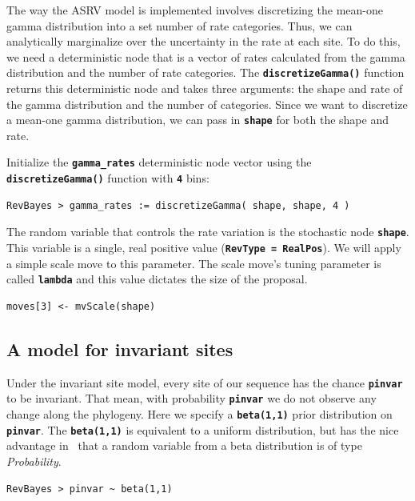 \documentclass[11pt]{article}
\newcommand{\cl}[1]{{\texttt{\textbf{#1}}}}
\begin{document}
The way the ASRV model is implemented involves discretizing the mean-one gamma distribution into a set number of rate categories. 
Thus, we can analytically marginalize over the uncertainty in the rate at each site. 
To do this, we need a deterministic node that is a vector of rates calculated from the gamma distribution and the number of rate categories. 
The \cl{discretizeGamma()} function returns this deterministic node and takes three arguments: the shape and rate of the gamma distribution and the number of categories. Since we want to discretize a mean-one gamma distribution, we can pass in \cl{shape} for both the shape and rate.

Initialize the \cl{gamma\_rates} deterministic node vector using the  \cl{discretizeGamma()} function with \cl{4} bins:
{\tt \begin{snugshade*}
\begin{lstlisting}
RevBayes > gamma_rates := discretizeGamma( shape, shape, 4 )
\end{lstlisting}
\end{snugshade*}}



The random variable that controls the rate variation is the stochastic node \cl{shape}. This variable is a single, real positive value (\cl{RevType = RealPos}). 
We will apply a simple scale move to this parameter.
The scale move's tuning parameter is called \cl{lambda} and this value dictates the size of the proposal.
{\tt \begin{snugshade*}
\begin{lstlisting}
moves[3] <- mvScale(shape)\end{lstlisting}
\end{snugshade*}}


\subsection*{A model for invariant sites}

Under the invariant site model, every site of our sequence has the chance \cl{pinvar} to be invariant.
That mean, with probability \cl{pinvar} we do not observe any change along the phylogeny.
Here we specify a \cl{beta(1,1)} prior distribution on \cl{pinvar}.
The \cl{beta(1,1)} is equivalent to a uniform distribution, but has the nice advantage in \Rev~that a random variable from a beta distribution is of type \textit{Probability}.
{\tt \begin{snugshade*}
\begin{lstlisting}
RevBayes > pinvar ~ beta(1,1)
\end{lstlisting}
\end{snugshade*}}
\end{document}
